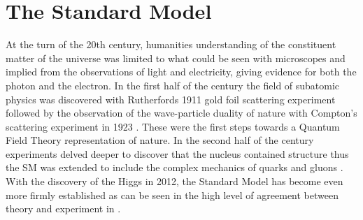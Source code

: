 \section{The Standard Model} \label{sec:theory:standardmodel}

At the turn of the 20th century, humanities understanding of the constituent
matter of the universe was limited to what could be seen with microscopes and
implied from the observations of light and electricity, giving evidence for
both the photon and the electron.  In the first half of the century the field
of subatomic physics was discovered with Rutherfords 1911 gold foil scattering
experiment \cite{Rutherford:1911zz} followed by the observation of
the wave-particle duality of nature with Compton's scattering experiment in
1923 \cite{PhysRev.21.483}. These were the first steps towards a Quantum Field
Theory representation of nature.  In the second half of the century experiments
delved deeper to discover that the nucleus contained structure thus the SM was
extended to include the complex mechanics of quarks and gluons
\cite{Fritzsch:1972jv}.  With the discovery of the Higgs in 2012, the Standard
Model has become even more firmly established as can be seen in the high level
of agreement between theory and experiment in .

